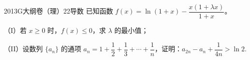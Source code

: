 
\begin{problem}{2013}{G}{大纲卷（理）}{22}{导数}
已知函数 $f(x)=\ln(1+x)-\dfrac{x(1+\lambda x)}{1+x}$。

（I）若 $x\geq 0$ 时，$f(x)\leq 0$，求 $\lambda$ 的最小值；

（II）设数列 $\{a_n\}$ 的通项 $a_n=1+\dfrac{1}{2}+\dfrac{1}{3}+\cdots+\dfrac{1}{n}$，证明：$a_{2n}-a_n+\dfrac{1}{4n}>\ln 2$.
\end{problem}
